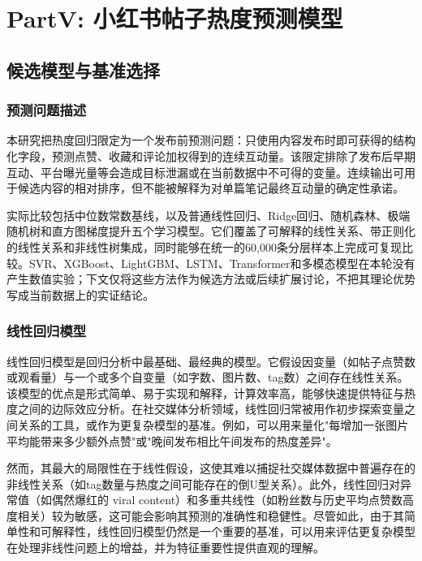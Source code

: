 \part{PartV: 小红书帖子热度预测模型}

\chapter{候选模型与基准选择}

\section{预测问题描述}

本研究把热度回归限定为一个发布前预测问题：只使用内容发布时即可获得的结构化字段，预测点赞、收藏和评论加权得到的连续互动量。该限定排除了发布后早期互动、平台曝光量等会造成目标泄漏或在当前数据中不可得的变量。连续输出可用于候选内容的相对排序，但不能被解释为对单篇笔记最终互动量的确定性承诺。

实际比较包括中位数常数基线，以及普通线性回归、Ridge回归、随机森林、极端随机树和直方图梯度提升五个学习模型。它们覆盖了可解释的线性关系、带正则化的线性关系和非线性树集成，同时能够在统一的60,000条分层样本上完成可复现比较。SVR、XGBoost、LightGBM、LSTM、Transformer和多模态模型在本轮没有产生数值实验；下文仅将这些方法作为候选方法或后续扩展讨论，不把其理论优势写成当前数据上的实证结论。

\section{线性回归模型}

线性回归模型是回归分析中最基础、最经典的模型。它假设因变量（如帖子点赞数或观看量）与一个或多个自变量（如字数、图片数、tag数）之间存在线性关系。该模型的优点是形式简单、易于实现和解释，计算效率高，能够快速提供特征与热度之间的边际效应分析。在社交媒体分析领域，线性回归常被用作初步探索变量之间关系的工具，或作为更复杂模型的基准。例如，可以用来量化"每增加一张图片平均能带来多少额外点赞"或"晚间发布相比午间发布的热度差异"。

然而，其最大的局限性在于线性假设，这使其难以捕捉社交媒体数据中普遍存在的非线性关系（如tag数量与热度之间可能存在的倒U型关系）。此外，线性回归对异常值（如偶然爆红的 viral content）和多重共线性（如粉丝数与历史平均点赞数高度相关）较为敏感，这可能会影响其预测的准确性和稳健性。尽管如此，由于其简单性和可解释性，线性回归模型仍然是一个重要的基准，可以用来评估更复杂模型在处理非线性问题上的增益，并为特征重要性提供直观的理解。

